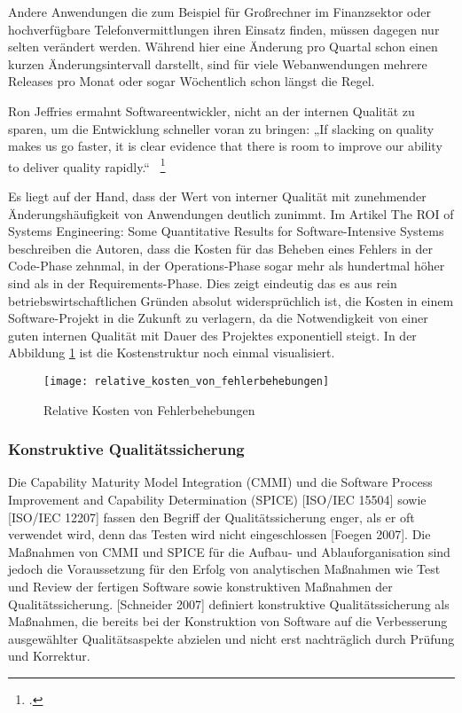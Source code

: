 Andere Anwendungen die zum Beispiel für Großrechner im Finanzsektor oder hochverfügbare Telefonvermittlungen ihren Einsatz finden, müssen dagegen nur selten verändert werden. Während hier eine Änderung pro Quartal schon einen kurzen Änderungsintervall darstellt, sind für viele Webanwendungen mehrere Releases pro Monat oder sogar Wöchentlich schon längst die Regel.

Ron Jeffries ermahnt Softwareentwickler, nicht an der internen Qualität zu sparen, um die Entwicklung schneller voran zu bringen:
„If slacking on quality makes us go faster, it is clear evidence that there is room to improve our ability to deliver quality rapidly.“ ~\footcite[Vgl.]{website:jeffries.2010}

Es liegt auf der Hand, dass der Wert von interner Qualität mit zunehmender Änderungshäufigkeit von Anwendungen deutlich zunimmt. Im Artikel \dq{}The ROI of Systems Engineering: Some Quantitative Results for
Software-Intensive Systems\dq{} beschreiben die Autoren, dass die Kosten für das Beheben eines Fehlers in der Code-Phase zehnmal, in der Operations-Phase sogar mehr als hundertmal höher sind als in der Requirements-Phase. 
Dies zeigt eindeutig das es aus rein betriebswirtschaftlichen Gründen absolut widersprüchlich ist, die Kosten in einem Software-Projekt in die Zukunft zu verlagern, da die Notwendigkeit von einer guten internen Qualität 
mit Dauer des Projektes exponentiell steigt. In der Abbildung \ref{relative_kosten_von_fehlerbehebungen} ist die Kostenstruktur noch einmal visualisiert.

\begin{figure}[H]
	\begin{center}
		\texttt{[image: relative\_kosten\_von\_fehlerbehebungen]}
		\caption{Relative Kosten von Fehlerbehebungen}
		\label{relative_kosten_von_fehlerbehebungen}
	\end{center}
\end{figure}


\subsubsection{Konstruktive Qualitätssicherung} %
Die Capability Maturity Model Integration (CMMI) und die Software Process Improvement and Capability Determination (SPICE) [ISO/IEC 15504] sowie [ISO/IEC 12207] fassen den Begriff der Qualitätssicherung enger, als er oft verwendet wird, denn das Testen wird nicht eingeschlossen [Foegen 2007]. Die Maßnahmen von CMMI und SPICE für die Aufbau- und Ablauforganisation sind jedoch die Voraussetzung für den Erfolg von analytischen Maßnahmen wie Test und Review der fertigen Software sowie konstruktiven Maßnahmen der Qualitätssicherung. [Schneider 2007] definiert konstruktive
Qualitätssicherung als Maßnahmen, die bereits bei der Konstruktion von Software auf die
Verbesserung ausgewählter Qualitätsaspekte abzielen und nicht erst nachträglich durch
Prüfung und Korrektur.

